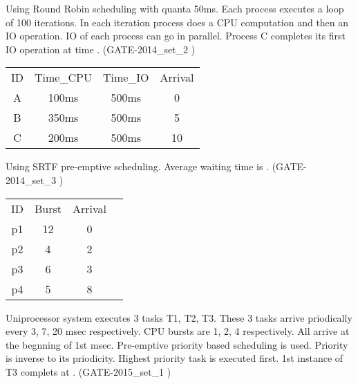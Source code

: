 \begin{questyle}

  \question  Using Round Robin scheduling with quanta 50ms. Each process executes a loop of 100 iterations.
             In each iteration process does a CPU computation and then an IO operation.
             IO of each process can go in parallel. Process C completes its first IO operation at time \fillin[time]. (GATE-2014\_set\_2 )
      \begin{center}
      \begin{tabular}{ c c c c }
          ID & Time\_CPU & Time\_IO  & Arrival\\
          A & 100ms & 500ms & 0 \\
          B & 350ms & 500ms & 5 \\
          C & 200ms & 500ms & 10 \\
      \end{tabular}
    \end{center}

  \end{questyle}






\begin{questyle}

  \question  Using SRTF pre-emptive scheduling. Average waiting time is \fillin[time]. (GATE-2014\_set\_3 )
      \begin{center}
      \begin{tabular}{ c c c c }
          ID & Burst & Arrival\\
          p1 & 12  & 0 \\
          p2 & 4  & 2 \\
          p3 & 6  & 3 \\
          p4 & 5  & 8 \\
      \end{tabular}
    \end{center}

  \end{questyle}




\begin{questyle}

  \question  Uniprocessor system executes 3 tasks T1, T2, T3. These 3 tasks arrive priodically every 3, 7, 20 msec respectively.
            CPU bursts are 1, 2, 4 respectively. All arrive at the begnning of 1st msec. Pre-emptive priority based scheduling
            is used. Priority is inverse to its priodicity. Highest priority task is executed first.
            1st instance of T3 complets at \fillin[time]. (GATE-2015\_set\_1 )

  \end{questyle}



